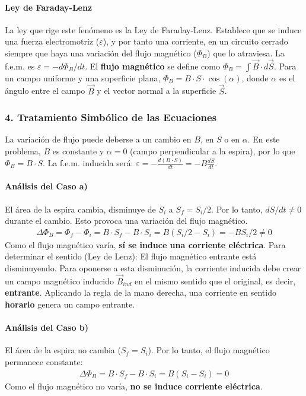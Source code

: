 \paragraph*{Ley de Faraday-Lenz}
La ley que rige este fenómeno es la Ley de Faraday-Lenz. Establece que se induce una fuerza electromotriz ($\varepsilon$), y por tanto una corriente, en un circuito cerrado siempre que haya una variación del flujo magnético ($\Phi_B$) que lo atraviesa. La f.e.m. es $\varepsilon = -d\Phi_B/dt$.
El \textbf{flujo magnético} se define como $\Phi_B = \int \vec{B} \cdot d\vec{S}$. Para un campo uniforme y una superficie plana, $\Phi_B = B \cdot S \cdot \cos(\alpha)$, donde $\alpha$ es el ángulo entre el campo $\vec{B}$ y el vector normal a la superficie $\vec{S}$.

\subsubsection*{4. Tratamiento Simbólico de las Ecuaciones}
La variación de flujo puede deberse a un cambio en $B$, en $S$ o en $\alpha$. En este problema, $B$ es constante y $\alpha=0$ (campo perpendicular a la espira), por lo que $\Phi_B = B \cdot S$.
La f.e.m. inducida será: $\varepsilon = -\frac{d(B \cdot S)}{dt} = -B \frac{dS}{dt}$.

\paragraph*{Análisis del Caso a)}
El área de la espira cambia, disminuye de $S_i$ a $S_f = S_i/2$. Por lo tanto, $dS/dt \neq 0$ durante el cambio. Esto provoca una variación del flujo magnético.
\begin{gather}
    \Delta\Phi_B = \Phi_f - \Phi_i = B \cdot S_f - B \cdot S_i = B(S_i/2 - S_i) = -B S_i / 2 \neq 0
\end{gather}
Como el flujo magnético varía, \textbf{sí se induce una corriente eléctrica}.
Para determinar el sentido (Ley de Lenz): El flujo magnético entrante está disminuyendo. Para oponerse a esta disminución, la corriente inducida debe crear un campo magnético inducido $\vec{B}_{ind}$ en el mismo sentido que el original, es decir, \textbf{entrante}. Aplicando la regla de la mano derecha, una corriente en sentido \textbf{horario} genera un campo entrante.

\paragraph*{Análisis del Caso b)}
El área de la espira no cambia ($S_f=S_i$). Por lo tanto, el flujo magnético permanece constante:
\begin{gather}
    \Delta\Phi_B = B \cdot S_f - B \cdot S_i = B(S_i - S_i) = 0
\end{gather}
Como el flujo magnético no varía, \textbf{no se induce corriente eléctrica}.

